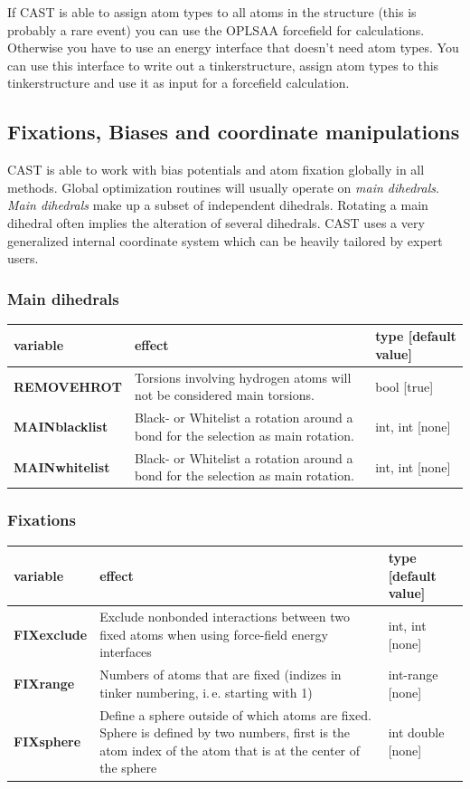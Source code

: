 \documentclass[10pt,a4paper]{article} %
\begin{document}
If CAST is able to assign atom types to all atoms in the structure (this is probably a rare event) you can use the OPLSAA forcefield for calculations. Otherwise you have to use an energy interface that doesn't need atom types. You can use this interface to write out a tinkerstructure, assign atom types to this tinkerstructure and use it as input for a forcefield calculation. 


\subsection{Fixations, Biases and coordinate manipulations}
\ac{CAST} is able to work with bias potentials and atom fixation globally in all methods. Global optimization routines will usually operate on \textit{main dihedrals}. \textit{Main dihedrals} make up a subset of independent dihedrals. Rotating a main dihedral often implies the alteration of several dihedrals. \ac{CAST} uses a very generalized internal coordinate system which can be heavily tailored by expert users.

\subsubsection{Main dihedrals}

\begin{longtable}{|p{3cm}|p{5cm}|p{3cm}|}
	variable & effect & type [default value] \\
	\hline
	\textbf{REMOVEHROT} & Torsions involving hydrogen atoms will not be considered main torsions. & bool [true] \\	
	\textbf{MAINblacklist} & Black- or Whitelist a rotation around a bond for the selection as main rotation. & int, int [none] \\
	\textbf{MAINwhitelist} & Black- or Whitelist a rotation around a bond for the selection as main rotation. & int, int [none] \\
\end{longtable} 

\subsubsection{Fixations}

\begin{longtable}{|p{3cm}|p{5cm}|p{3cm}|}
	variable & effect & type [default value] \\
	\hline
	\textbf{FIXexclude} & Exclude nonbonded interactions between two fixed atoms when using force-field energy interfaces & int, int [none] \\
	\textbf{FIXrange} & Numbers of atoms that are fixed (indizes in tinker numbering, i.\,e. starting with 1) & int-range [none] \\
	\textbf{FIXsphere} & Define a sphere outside of which atoms are fixed. Sphere is defined by two numbers, first is the atom index of the atom that is at the center of the sphere& int double [none] \\
\end{longtable} 
\end{document}
